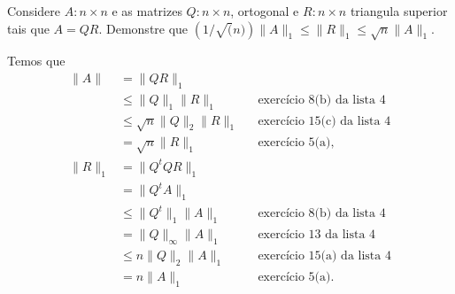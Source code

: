\begin{questions}

    \question Considere $A: n \times n$ e as matrizes $Q: n \times n$, ortogonal e $R: n \times n$ triangula superior tais que $A = QR$. Demonstre que $\left( 1 / \sqrt(n) \right) \| A \|_1 \leq \| R \|_1 \leq \sqrt{n} \| A \|_1$.
    \begin{solution}
        Temos que
        \begin{align*}
            \| A \| &= \| Q R \|_1 \\
            &\leq \| Q \|_1 \| R \|_1 && \text{exerc\'{i}cio 8(b) da lista 4} \\
            &\leq \sqrt{n} \| Q \|_2 \| R \|_1 && \text{exerc\'{i}cio 15(c) da lista 4} \\
            &= \sqrt{n} \| R \|_1 && \text{exerc\'{i}cio 5(a)}, \\
            \| R \|_1 &= \| Q^t Q R \|_1 \\
            &= \| Q^t A \|_1 \\
            &\leq \| Q^t \|_1 \| A \|_1 && \text{exerc\'{i}cio 8(b) da lista 4} \\
            &= \| Q \|_\infty \| A \|_1 && \text{exerc\'{i}cio 13 da lista 4} \\
            &\leq n \| Q \|_2 \| A \|_1 && \text{exerc\'{i}cio 15(a) da lista 4} \\
            &= n \| A \|_1 && \text{exerc\'{i}cio 5(a)}.
        \end{align*}
    \end{solution}


\end{questions}
